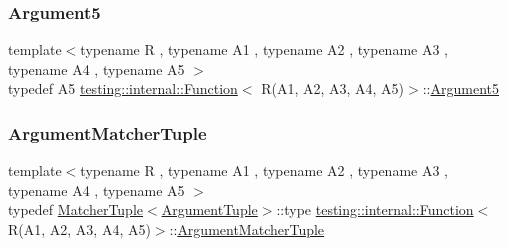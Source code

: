 \subsubsection{\texorpdfstring{Argument5}{Argument5}}
{\footnotesize\ttfamily template$<$typename R , typename A1 , typename A2 , typename A3 , typename A4 , typename A5 $>$ \\
typedef A5 \mbox{\hyperlink{structtesting_1_1internal_1_1_function}{testing\+::internal\+::\+Function}}$<$ R(A1, A2, A3, A4, A5)$>$\+::\mbox{\hyperlink{structtesting_1_1internal_1_1_function_3_01_r_07_a1_00_01_a2_00_01_a3_00_01_a4_00_01_a5_08_4_a5bc0279c43aa98c409219dee1b815c71}{Argument5}}}

\mbox{\label{structtesting_1_1internal_1_1_function_3_01_r_07_a1_00_01_a2_00_01_a3_00_01_a4_00_01_a5_08_4_a03c18380538e53141227afe6d0f20cc8}} 
\subsubsection{\texorpdfstring{ArgumentMatcherTuple}{ArgumentMatcherTuple}}
{\footnotesize\ttfamily template$<$typename R , typename A1 , typename A2 , typename A3 , typename A4 , typename A5 $>$ \\
typedef \mbox{\hyperlink{structtesting_1_1internal_1_1_matcher_tuple}{Matcher\+Tuple}}$<$\mbox{\hyperlink{structtesting_1_1internal_1_1_function_3_01_r_07_08_4_ad483c3128c470d8cdb55c3ac1c575c11}{Argument\+Tuple}}$>$\+::type \mbox{\hyperlink{structtesting_1_1internal_1_1_function}{testing\+::internal\+::\+Function}}$<$ R(A1, A2, A3, A4, A5)$>$\+::\mbox{\hyperlink{structtesting_1_1internal_1_1_function_3_01_r_07_08_4_a9bec5cf8937e8af99dedab2f40129fab}{Argument\+Matcher\+Tuple}}}

\mbox{\label{structtesting_1_1internal_1_1_function_3_01_r_07_a1_00_01_a2_00_01_a3_00_01_a4_00_01_a5_08_4_af5a1487829347eae2a48b2f66f216f52}} 

